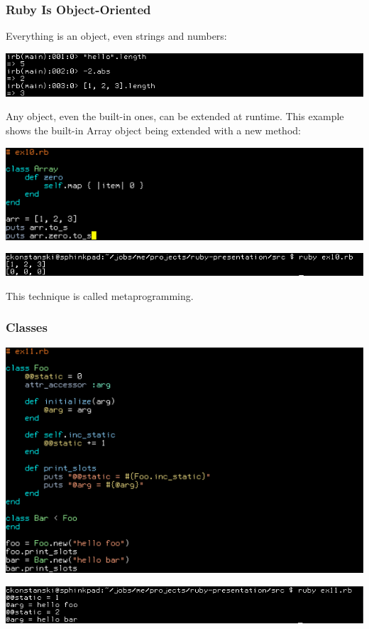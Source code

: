 \documentclass[helvetica,english,utf8,notitle,nologo]{beamer}
\begin{document}
\begin{frame}
  \frametitle{Ruby Is Object-Oriented}

  Everything is an object, even strings and numbers:

  \includegraphics[scale=0.5]{irb_3}

  Any object, even the built-in ones, can be extended at runtime. This
  example shows the built-in Array object being extended with a new
  method:

  \includegraphics[scale=0.53]{src_10}
  
  \includegraphics[scale=0.5]{out_10}

  This technique is called metaprogramming.
\end{frame}

\begin{frame}
  \frametitle{Classes}

  \includegraphics[scale=0.53]{src_11}
  
  \includegraphics[scale=0.5]{out_11}
\end{frame}
\end{document}
